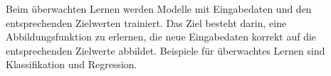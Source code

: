 Beim überwachten Lernen werden Modelle mit Eingabedaten und den entsprechenden
Zielwerten trainiert. Das Ziel besteht darin, eine Abbildungsfunktion zu
erlernen, die neue Eingabedaten korrekt auf die entsprechenden Zielwerte
abbildet. Beispiele für überwachtes Lernen sind Klassifikation und Regression.